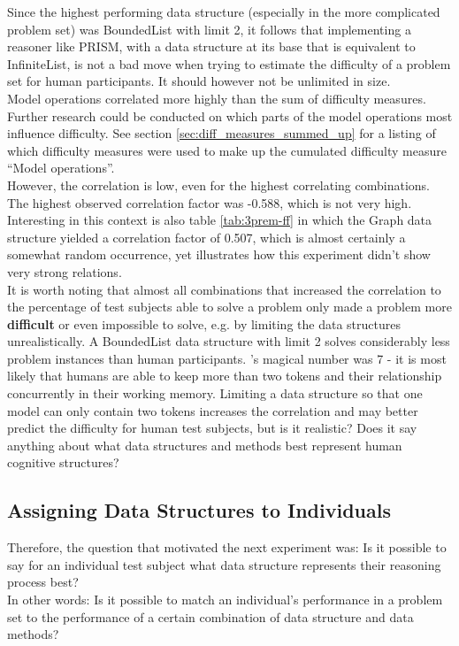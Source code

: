 \documentclass[hidelinks]{scrartcl}
\begin{document}
Since the highest performing data structure (especially in the more complicated problem set) was BoundedList with limit 2, it follows that implementing a reasoner like PRISM, with a data structure at its base that is equivalent to InfiniteList, is not a bad move when trying to estimate the difficulty of a problem set for human participants. It should however not be unlimited in size. \\
Model operations correlated more highly than the sum of difficulty measures. Further research could be conducted on which parts of the model operations most influence difficulty. See section \ref{sec:diff_measures_summed_up} for a listing of which difficulty measures were used to make up the cumulated difficulty measure ``Model operations''. \\
However, the correlation is low, even for the highest correlating combinations. The highest observed correlation factor was -0.588, which is not very high. Interesting in this context is also table \ref{tab:3prem-ff} in which the Graph data structure yielded a correlation factor of 0.507, which is almost certainly a somewhat random occurrence, yet illustrates how this experiment didn't show very strong relations. \\
It is worth noting that almost all combinations that increased the correlation to the percentage of test subjects able to solve a problem only made a problem more \textbf{difficult} or even impossible to solve, e.g. by limiting the data structures unrealistically. A BoundedList data structure with limit 2 solves considerably less problem instances than human participants. \cite{Miller.1956}'s magical number was 7 - it is most likely that humans are able to keep more than two tokens and their relationship concurrently in their \gls{working memory}. Limiting a data structure so that one model can only contain two tokens increases the correlation and may better predict the difficulty for human test subjects, but is it realistic? Does it say anything about what data structures and methods best represent human cognitive structures?

\subsection{Assigning Data Structures to Individuals}\label{sec:exp2}
Therefore, the question that motivated the next experiment was: Is it possible to say for an individual test subject what data structure represents their reasoning process best? \\
In other words: Is it possible to match an individual's performance in a problem set to the performance of a certain combination of data structure and data methods?
\end{document}
